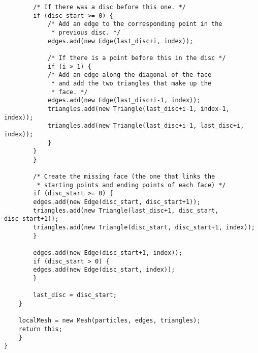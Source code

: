 \begin{lstlisting}
		/* If there was a disc before this one. */
		if (disc_start >= 0) {
		    /* Add an edge to the corresponding point in the
		     * previous disc. */
		    edges.add(new Edge(last_disc+i, index));

		    /* If there is a point before this in the disc */
		    if (i > 1) {
			/* Add an edge along the diagonal of the face
			 * and add the two triangles that make up the
			 * face. */
			edges.add(new Edge(last_disc+i-1, index));
			triangles.add(new Triangle(last_disc+i-1, index-1, index));
			triangles.add(new Triangle(last_disc+i-1, last_disc+i, index));
		    }
		}
	    }

	    /* Create the missing face (the one that links the
	     * starting points and ending points of each face) */
	    if (disc_start >= 0) {
		edges.add(new Edge(disc_start, disc_start+1));
		triangles.add(new Triangle(last_disc+1, disc_start, disc_start+1));
		triangles.add(new Triangle(disc_start, disc_start+1, index));
	    }

	    edges.add(new Edge(disc_start+1, index));
	    if (disc_start > 0) {
		edges.add(new Edge(disc_start, index));
	    }

	    last_disc = disc_start;
	}

	localMesh = new Mesh(particles, edges, triangles);
	return this;
    }
}\end{lstlisting}

